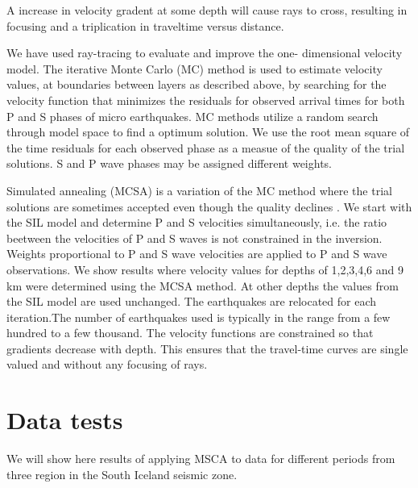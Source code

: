 \documentclass[extra]{gji}
\begin{document}
A increase in velocity gradent at some depth will cause rays to cross, resulting in 
focusing and a triplication in 
traveltime versus distance.

We have  used ray-tracing to evaluate and improve the one-
dimensional velocity model. The iterative Monte Carlo (MC) method is used
to estimate velocity values, at boundaries between layers as described
above, by searching for the velocity function that minimizes the
residuals for observed arrival times for both P and S phases of micro
earthquakes.
MC methods utilize a random search through model space to find a
optimum solution. We use the root mean square of the time
residuals for each observed phase as a measue of the quality of the
trial solutions. S and P wave phases may be assigned different weights.

Simulated annealing (MCSA) is a variation of the MC
method where the trial solutions are sometimes accepted even though
the quality declines \citep{menke13}.
We start with the SIL model and determine P and S velocities
simultaneously, i.e. the ratio beetween the velocities of P and S waves
is not constrained in the inversion. Weights proportional to P and S
wave velocities are applied to P and S wave observations. We show
results where velocity values for depths of 1,2,3,4,6 and 9 km were
determined using the MCSA method. At other depths the values from
the SIL model are used unchanged. The earthquakes are relocated for
each iteration.The number of earthquakes used is typically in the
range from a few hundred to a few thousand. The velocity functions
are constrained so that gradients decrease with depth. This ensures
that the travel-time curves are single valued and without any focusing
of rays.

\section{Data tests}
We will show here results of applying MSCA to data for different periods 
from three region in the South Iceland seismic zone.




\bsp %

\label{lastpage}
\end{document}
